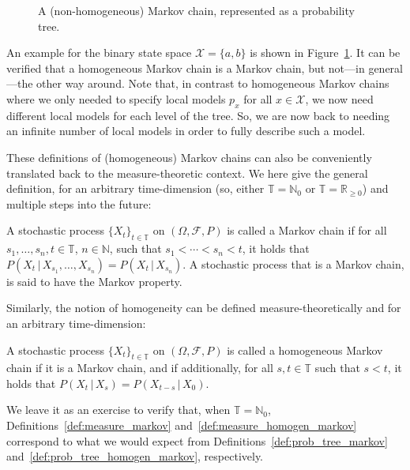 \documentclass[graybox]{svmult}
\newcommand{\nats}{\mathbb{N}}
\newcommand{\natswith}{\nats_{0}}
\newcommand{\reals}{\mathbb{R}}
\newcommand{\realsnonneg}{\reals_{\geq 0}}
\newcommand{\states}{\mathcal{X}}
\newcommand{\timedim}{\mathbb{T}}
\begin{document}
\begin{figure}
\caption{A (non-homogeneous) Markov chain, represented as a probability tree.}
\label{fig:example_markov_tree}
\end{figure}
An example for the binary state space $\states=\{a,b\}$ is shown in Figure~\ref{fig:example_markov_tree}. It can be verified that a homogeneous Markov chain is a Markov chain, but not---in general---the other way around. 
Note that, in contrast to homogeneous Markov chains where we only needed to specify local models $p_x$ for all $x\in\states$, we now need different local models for each level of the tree. So, we are now back to needing an infinite number of local models in order to fully describe such a model.

These definitions of (homogeneous) Markov chains can also be conveniently translated back to the measure-theoretic context. We here give the general definition, for an arbitrary time-dimension (so, either $\timedim=\natswith$ or $\timedim=\realsnonneg$) and multiple steps into the future:
\begin{definition}\label{def:measure_markov}
A stochastic process $\{X_t\}_{t\in\timedim}$ on $(\Omega,\mathcal{F},P)$ is called a Markov chain if for all $s_1,\ldots,s_n,t\in\timedim$, $n\in\nats$, such that $s_1<\cdots<s_n<t$, it holds that $P(X_t\,\vert\,X_{s_1},\ldots,X_{s_n}) = P(X_t\,\vert\,X_{s_n})$. A stochastic process that is a Markov chain, is said to have the Markov property.
\end{definition}
Similarly, the notion of homogeneity can be defined measure-theoretically and for an arbitrary time-dimension:  
\begin{definition}\label{def:measure_homogen_markov}
A stochastic process $\{X_t\}_{t\in\timedim}$ on $(\Omega,\mathcal{F},P)$ is called a homogeneous Markov chain if it is a Markov chain, and if additionally, for all $s,t\in\timedim$ such that $s<t$, it holds that $P(X_t\,\vert\,X_s)=P(X_{t-s}\,\vert\,X_0)$.
\end{definition}
We leave it as an exercise to verify that, when $\timedim=\natswith$, Definitions~\ref{def:measure_markov} and~\ref{def:measure_homogen_markov} correspond to what we would expect from Definitions~\ref{def:prob_tree_markov} and~\ref{def:prob_tree_homogen_markov}, respectively.
\end{document}
